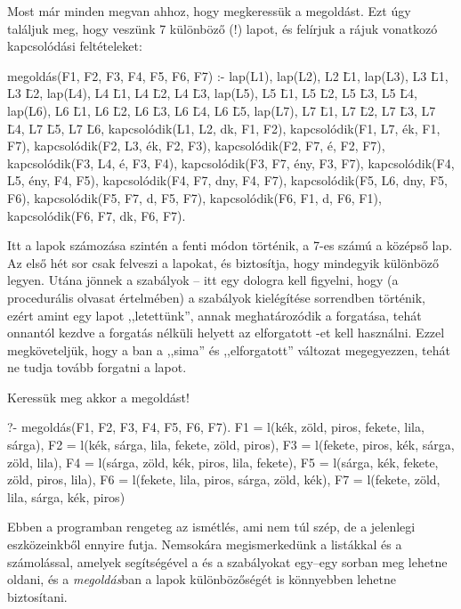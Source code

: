Most már minden megvan ahhoz, hogy megkeressük a
megoldást. Ezt úgy találjuk meg, hogy veszünk 7
különböző (!) lapot, és felírjuk a rájuk vonatkozó
kapcsolódási feltételeket:
\begin{program}
megoldás(F1, F2, F3, F4, F5, F6, F7) :-
    lap(L1),
    lap(L2), L2 \= L1,
    lap(L3), L3 \= L1, L3 \= L2,
    lap(L4), L4 \= L1, L4 \= L2, L4 \= L3,
    lap(L5), L5 \= L1, L5 \= L2, L5 \= L3, L5 \= L4,
    lap(L6), L6 \= L1, L6 \= L2, L6 \= L3, L6 \= L4,
             L6 \= L5,
    lap(L7), L7 \= L1, L7 \= L2, L7 \= L3, L7 \= L4,
             L7 \= L5, L7 \= L6,
    kapcsolódik(L1, L2, dk,  F1, F2),
    kapcsolódik(F1, L7, ék,  F1, F7),
    kapcsolódik(F2, L3, ék,  F2, F3),
    kapcsolódik(F2, F7, é,   F2, F7),
    kapcsolódik(F3, L4, é,   F3, F4),
    kapcsolódik(F3, F7, ény, F3, F7),
    kapcsolódik(F4, L5, ény, F4, F5),
    kapcsolódik(F4, F7, dny, F4, F7),
    kapcsolódik(F5, L6, dny, F5, F6),
    kapcsolódik(F5, F7, d,   F5, F7),
    kapcsolódik(F6, F1, d,   F6, F1),
    kapcsolódik(F6, F7, dk,  F6, F7).
\end{program}
Itt a lapok számozása szintén a fenti módon
történik, a 7-es számú a középső lap. Az első hét
sor csak felveszi a lapokat, és biztosítja, hogy
mindegyik különböző legyen. Utána jönnek a szabályok
-- itt egy dologra kell figyelni, hogy (a
procedurális olvasat értelmében) a 
szabályok kielégítése sorrendben történik, ezért
amint egy lapot ,,letettünk'', annak meghatározódik
a forgatása, tehát onnantól kezdve a forgatás
nélküli  helyett az elforgatott -et kell
használni. Ezzel megköveteljük, hogy a
ban a ,,sima'' és ,,elforgatott''
változat megegyezzen, tehát ne tudja tovább forgatni
a lapot.

Keressük meg akkor a megoldást!
\begin{query}
?- megoldás(F1, F2, F3, F4, F5, F6, F7).
F1 = l(kék, zöld, piros, fekete, lila, sárga),
F2 = l(kék, sárga, lila, fekete, zöld, piros),
F3 = l(fekete, piros, kék, sárga, zöld, lila),
F4 = l(sárga, zöld, kék, piros, lila, fekete),
F5 = l(sárga, kék, fekete, zöld, piros, lila),
F6 = l(fekete, lila, piros, sárga, zöld, kék),
F7 = l(fekete, zöld, lila, sárga, kék, piros)
\end{query}

Ebben a programban rengeteg az ismétlés, ami nem túl
szép, de a jelenlegi eszközeinkből ennyire
futja. Nemsokára megismerkedünk a listákkal és a
számolással, amelyek segítségével a  és a
 szabályokat egy--egy sorban meg
lehetne oldani, és a \emph{megoldás}ban a lapok
különbözőségét is könnyebben lehetne biztosítani.
